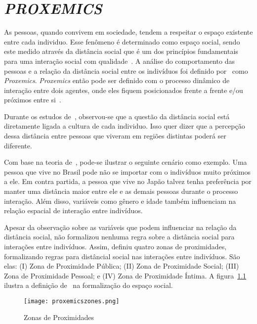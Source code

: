 \chapter{\emph{PROXEMICS}}
\label{cap:proxemics}
As pessoas, quando convivem em sociedade, tendem a respeitar o espaço existente entre cada individuo. Esse fenômeno é determinado como espaço social, sendo este medido através da distância social que é um dos princípios fundamentais para uma interação social com qualidade~\cite{hall:1969, henkel:2014}. A análise do comportamento das pessoas e a relação da distância social entre os indivíduos foi definido por~ como \emph{Proxemics}. \emph{Proxemics} então pode ser definido com o processo dinâmico de interação entre dois agentes, onde eles fiquem posicionados frente a frente e/ou próximos entre si~\cite{mead:2011b}.

Durante os estudos de~, observou-se que a questão da distância social está diretamente ligada a cultura de cada individuo. Isso quer dizer que a percepção dessa distância entre pessoas que viveram em regiões distintas poderá ser diferente.

Com base na teoria de~, pode-se ilustrar o seguinte cenário como exemplo. Uma pessoa que vive no Brasil pode não se importar com o indivíduos muito próximos a ele. Em contra partida, a pessoa que vive no Japão talvez tenha preferência por manter uma distância maior entre ele e as demais pessoas durante o processo interação. Além disso, variáveis como gênero e idade também influenciam na relação espacial de interação entre indivíduos.

Apesar da observação sobre as variáveis que podem influenciar na relação da distância social,  não formalizou nenhuma regra sobre a distância social para interações entre indivíduos. Assim,  definiu quatro zonas de proximidades, formalizando regras para distâncial social nas interações entre indivíduos. São elas: (I) Zona de Proximidade Pública; (II) Zona de Proximidade Social; (III) Zona de Proximidade Pessoal; e (IV) Zona de Proximidade Íntima. A figura~\ref{fig:proximityzones} ilustra a definição de~ na formalização do espaço social.

\begin{figure}[ht!]
	\centering
	\begin{minipage}{\textwidth}
		\caption{Zonas de Proximidades}
		\texttt{[image: proxemicszones.png]}
		\label{fig:proximityzones}
	\end{minipage}
\end{figure}

